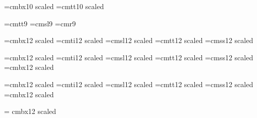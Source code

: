 \begin{\parsearg\beginxxx}
\font{}=cmbx10 scaled  %
\font{}=cmtt10 scaled 
\def\df{\let\tt=\deftt \defbf}

\font\ninett=cmtt9
\font\indit=cmsl9 \font\indrm=cmr9
\let\indtt=\ninett
\def\indbf{\indrm} \def\indsl{\indit}
\def\indexfonts{\let\it=\indit \let\sl=\indsl \let\bf=\indbf \let\rm=\indrm
\let\tt=\indtt}

\font\chaprm=cmbx12 scaled 
\font\chapit=cmti12 scaled 
\font\chapsl=cmsl12 scaled 
\font\chaptt=cmtt12 scaled 
\font\chapsf=cmss12 scaled 
\let\chapbf=\chaprm

\font\secrm=cmbx12 scaled 
\font\secit=cmti12 scaled 
\font\secsl=cmsl12 scaled 
\font\sectt=cmtt12 scaled 
\font\secsf=cmss12 scaled 
\font\secbf=cmbx12 scaled 




\font\ssecrm=cmbx12 scaled \magstephalf
\font\ssecit=cmti12 scaled \magstephalf
\font\ssecsl=cmsl12 scaled \magstephalf
\font\ssectt=cmtt12 scaled \magstephalf
\font\ssecsf=cmss12 scaled \magstephalf
\font\ssecbf=cmbx12 scaled \magstephalf

\font\titlerm = cmbx12 scaled 
\let\authorrm = \secrm

\def\textfonts{\let\rm=\tenrm\let\it=\tenit\let\sl=\tensl\let\bf=\tenbf%
\let\smallcaps=\tensc\let\sf=\tensf}
\def\chapfonts{\let\rm=\chaprm\let\it=\chapit\let\sl=\chapsl\let\bf=\chapbf\let\tt=\chaptt\let\sf=\chapsf}
\def\secfonts{\let\rm=\secrm\let\it=\secit\let\sl=\secsl\let\bf=\secbf\let\tt=\sectt\let\sf=\secsf}
\def\subsecfonts{\let\rm=\ssecrm\let\it=\ssecit\let\sl=\ssecsl\let\bf=\ssecbf\let\tt=\ssectt\let\sf=\ssecsf}
\newcount\fontdepth {}


\end{\parsearg\beginxxx}

